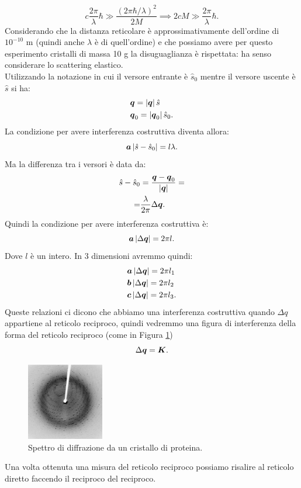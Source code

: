 \[
	c \frac{2\pi}{\lambda}\hbar \gg 
	\frac{\left( 2\pi\hbar /\lambda \right)^2}{2M}
	\implies
	2cM \gg \frac{2\pi}{\lambda}\hbar 
.\] 
Considerando che la distanza reticolare è approssimativamente dell'ordine di $10^{-10}$ m (quindi anche $\lambda$ è di quell'ordine) e che possiamo avere per questo esperimento cristalli di massa 10 g la disuguaglianza è rispettata: ha senso considerare lo scattering elastico.\\
Utilizzando la notazione in cui il versore entrante è $\hat{s}_0$ mentre il versore uscente è $\hat{s}$ si ha:
\[\begin{aligned}
	&\boldsymbol{q}=\left| \boldsymbol{q} \right| \hat{s}\\
	&\boldsymbol{q}_0=\left| \boldsymbol{q}_0 \right| \hat{s}_0
.\end{aligned}\]
La condizione per avere interferenza costruttiva diventa allora:
\[
	\boldsymbol{a}\left| \hat{s}-\hat{s}_0 \right| = l\lambda
.\] 
Ma la differenza tra i versori è data da:
\[\begin{aligned}
	\hat{s}-\hat{s}_0 
	&=
	\frac{\boldsymbol{q}-\boldsymbol{q}_0}{\left| \boldsymbol{q} \right| } =\\
	=& 
	\frac{\lambda}{2\pi} \Delta\boldsymbol{q}
.\end{aligned}\]
Quindi la condizione per avere interferenza costruttiva è:
\[
	\boldsymbol{a}\left| \Delta\boldsymbol{q} \right| =2\pi l
.\] 
Dove $l$ è un intero. In 3 dimensioni avremmo quindi:
\[\begin{aligned}
	&\boldsymbol{a}\left| \Delta\boldsymbol{q} \right| =2\pi l_1\\
	&\boldsymbol{b}\left| \Delta\boldsymbol{q} \right| =2\pi l_2\\
	&\boldsymbol{c}\left| \Delta\boldsymbol{q} \right| =2\pi l_3
.\end{aligned}\]
Queste relazioni ci dicono che abbiamo una interferenza costruttiva quando $\Delta q$ appartiene al reticolo reciproco, quindi vedremmo una figura di interferenza della forma del reticolo reciproco (come in Figura \ref{fig:diffrazione-proteina})
\[
	\Delta\boldsymbol{q}=\boldsymbol{K}
.\] 
\begin{figure}[ht]
	\centering
	\includegraphics[width=0.3\textwidth]{figures/X-ray_diffraction_pattern_3clpro.jpg}
	\caption{\scriptsize Spettro di diffrazione da un cristallo di proteina.}
	\label{fig:diffrazione-proteina}
\end{figure}
Una volta ottenuta una misura del reticolo reciproco possiamo risalire al reticolo diretto faccendo il reciproco del reciproco.

